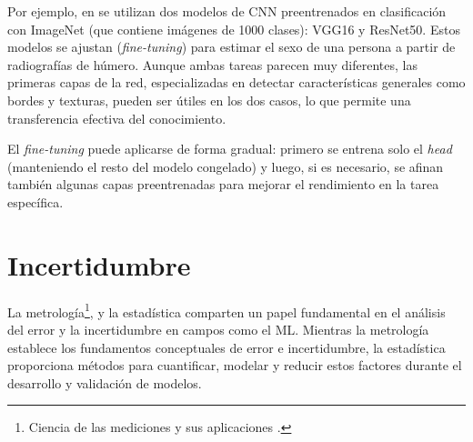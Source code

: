 Por ejemplo, en \cite{venema2022} se utilizan dos modelos de CNN preentrenados en clasificación con ImageNet 
(que contiene imágenes de 1000 clases): VGG16 y ResNet50. Estos modelos se ajustan (\textit{fine-tuning}) 
para estimar el sexo de una persona a partir de radiografías de húmero. Aunque ambas tareas parecen muy 
diferentes, las primeras capas de la red, especializadas en detectar características generales como bordes y 
texturas, pueden ser útiles en los dos casos, lo que permite una transferencia efectiva del conocimiento.

El \textit{fine-tuning} puede aplicarse de forma gradual: primero se entrena solo el \textit{head} 
(manteniendo el resto del modelo congelado) y luego, si es necesario, se afinan también algunas capas 
preentrenadas para mejorar el rendimiento en la tarea específica.



\section{Incertidumbre}

La metrología\footnote{
    Ciencia de las mediciones y sus aplicaciones \cite{jcgm200:2012}.
}, y la estadística comparten un papel fundamental en el análisis del error y la incertidumbre en campos como 
el ML. Mientras la metrología establece los fundamentos conceptuales de error e incertidumbre, la estadística 
proporciona métodos para cuantificar, modelar y reducir estos factores durante el desarrollo y validación de 
modelos.

